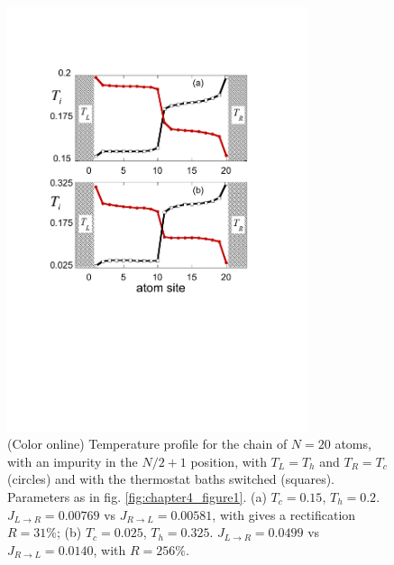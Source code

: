 \begin{figure}
\centering
\includegraphics[width=8.8cm]{Figures/FIG4b.pdf}
\caption{(Color online) Temperature profile for the chain of $N=20$ atoms, with an impurity in the $N/2+1$ position, with $T_L=T_h$ and $T_R=T_c$ (circles) and with the thermostat baths switched (squares).
Parameters as in fig. \ref{fig:chapter4_figure1}.
(a) $T_c=0.15$, $T_h=0.2$. $J_{L\rightarrow R}=0.00769$ vs $J_{R\rightarrow L}=0.00581$, with gives a rectification $R=31 \% $; (b) $T_c=0.025$, $T_h=0.325$. $J_{L\rightarrow R}=0.0499$ vs  $J_{R\rightarrow L}=0.0140$, with $R=256 \%$.}
\label{fig:chapter4_figure4}
\end{figure}



